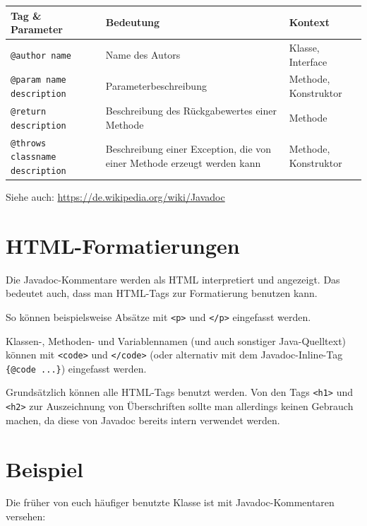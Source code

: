 \medskip
\bgroup
\def\arraystretch{1.2}
\begin{tabularx}{\textwidth}{|X|p{55mm}|p{30mm}|}\hline
\textbf{Tag \& Parameter} & \textbf{Bedeutung} & \textbf{Kontext} \\ \hline
\texttt{@author name} & Name des Autors & Klasse, Interface \\ \hline
\texttt{@param name description} & Parameterbeschreibung & Methode, Konstruktor \\ \hline 
\texttt{@return description} & Beschreibung des Rückgabewertes einer Methode
& Methode \\ \hline
\texttt{@throws classname description} & Beschreibung einer Exception, die
von einer Methode erzeugt werden kann & Methode, Konstruktor \\ \hline
\end{tabularx}
\egroup

\medskip
Siehe auch: \url{https://de.wikipedia.org/wiki/Javadoc}


\section{HTML-Formatierungen}

Die Javadoc-Kommentare werden als HTML interpretiert und angezeigt. Das bedeutet
auch, dass man HTML-Tags zur Formatierung benutzen kann.

So können beispielsweise Absätze mit \lstinline|<p>| und \lstinline|</p>|
eingefasst werden.

Klassen-, Methoden- und Variablennamen (und auch sonstiger Java-Quelltext) können
mit \lstinline|<code>| und \lstinline|</code>| (oder alternativ mit dem
Javadoc-Inline-Tag \lstinline|{@code ...}|) eingefasst werden.

Grundsätzlich können alle HTML-Tags benutzt werden. Von den
Tags \lstinline|<h1>| und \lstinline|<h2>| zur Auszeichnung von Überschriften
sollte man allerdings keinen Gebrauch machen, da diese von Javadoc bereits
intern verwendet werden.


\section{Beispiel}

Die früher von euch häufiger benutzte Klasse  ist mit
Javadoc-Kommentaren versehen:

